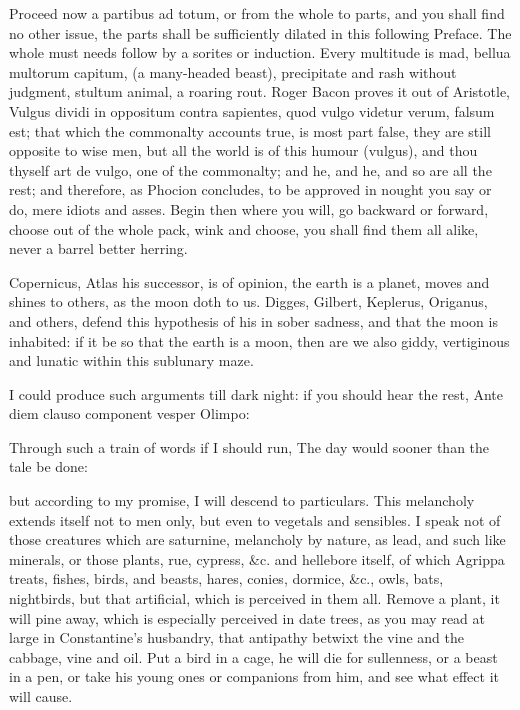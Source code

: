 {Proceed now a partibus ad totum, or from the whole to parts, and you
shall find no other issue, the parts shall be sufficiently dilated in
this following Preface. The whole must needs follow by a sorites or
induction. Every multitude is mad, bellua multorum capitum, (a
many-headed beast), precipitate and rash without judgment, stultum
animal, a roaring rout. Roger Bacon proves it out of Aristotle,
Vulgus dividi in oppositum contra sapientes, quod vulgo videtur verum,
falsum est; that which the commonalty accounts true, is most part
false, they are still opposite to wise men, but all the world is of
this humour (vulgus), and thou thyself art de vulgo, one of the
commonalty; and he, and he, and so are all the rest; and therefore, as
Phocion concludes, to be approved in nought you say or do, mere idiots
and asses. Begin then where you will, go backward or forward, choose
out of the whole pack, wink and choose, you shall find them all alike,
never a barrel better herring.

Copernicus, Atlas his successor, is of opinion, the earth is a planet,
moves and shines to others, as the moon doth to us. Digges, Gilbert,
Keplerus, Origanus, and others, defend this hypothesis of his in sober
sadness, and that the moon is inhabited: if it be so that the earth is
a moon, then are we also giddy, vertiginous and lunatic within this
sublunary maze.

I could produce such arguments till dark night: if you should hear the
rest,
Ante diem clauso component vesper Olimpo:

Through such a train of words if I should run,
The day would sooner than the tale be done:

but according to my promise, I will descend to particulars. This
melancholy extends itself not to men only, but even to vegetals and
sensibles. I speak not of those creatures which are saturnine,
melancholy by nature, as lead, and such like minerals, or those plants,
rue, cypress, \&c. and hellebore itself, of which Agrippa treats,
fishes, birds, and beasts, hares, conies, dormice, \&c., owls, bats,
nightbirds, but that artificial, which is perceived in them all. Remove
a plant, it will pine away, which is especially perceived in date
trees, as you may read at large in Constantine's husbandry, that
antipathy betwixt the vine and the cabbage, vine and oil. Put a bird in
a cage, he will die for sullenness, or a beast in a pen, or take his
young ones or companions from him, and see what effect it will cause.

}
